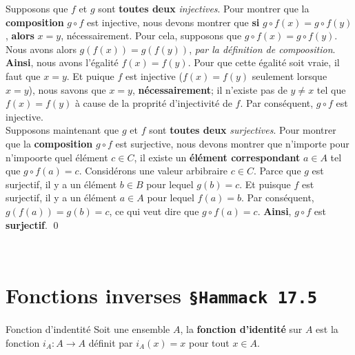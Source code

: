 \documentclass[16pt]{report}
\begin{document}
\begin{multicols*}{2}
            \begin{Preuve}{}{}
                Supposons que $f$ et $g$ sont \textbf{toutes deux} 
                \textit{injectives}. Pour montrer que la \textbf{composition}
               $g\circ f$ est injective, nous devons montrer que \textbf{si} $g\circ f(x) = g\circ f(y)$, 
               \textbf{alors} $x = y$, nécessairement. Pour cela, supposons que $g\circ f(x) = g\circ f(y)$. 
               Nous avons alors $g(f(x)) = g(f(y))$, \textit{par la définition de compoosition}. \textbf{Ainsi}, 
               nous avons l'égalité $f(x) = f(y)$. Pour que cette égalité soit vraie, il faut que $x = y$. Et 
               puique $f$ est injective ($f(x) = f(y)$ seulement lorsque $x = y$), nous savons que 
               $x = y$, \textbf{nécessairement}; il n'existe pas de $y \neq x$ tel que $f(x) = f(y)$ à cause 
               de la proprité d'injectivité de $f$. Par conséquent, $g\circ f$ est injective.    
               \vspace{1em}
               \\
               Supposons maintenant que $g$ et $f$ sont \textbf{toutes deux} \textit{surjectives}. Pour montrer que 
               la \textbf{composition} $g\circ f$ est surjective, nous devons montrer que n'importe pour 
               n'impoorte quel élément $c \in C$, il existe un \textbf{élément correspondant}   $a \in A$ tel que 
               $g\circ f(a) = c$. Considérons une valeur arbibraire $c \in C$. Parce que                        
               $g$ est surjectif, il y a un élément $b \in B$ pour lequel $g(b) = c$. Et puisque 
               $f$ est surjectif, il y a un élément $a \in A$ pour lequel $f(a) = b$. Par conséquent, 
               $g(f(a)) = g(b) = c$, ce qui veut dire que $g\circ f(a) = c$. \textbf{Ainsi}, 
               $g\circ f$ est \textbf{surjectif}. \qed  
            \end{Preuve}

\

    \section{Fonctions inverses \texttt{\small{\S Hammack 17.5}}}
            

            \begin{Definitionx}{Fonction d'indentité}{}
                   Soit une ensemble $A$, la \textbf{fonction d'identité} sur $A$ est la fonction 
                   $i_A : A \rightarrow  A$ définit par $i_A(x) = x$ pour tout $x \in A$. 
            \end{Definitionx}   




\end{multicols*}
\end{document}
